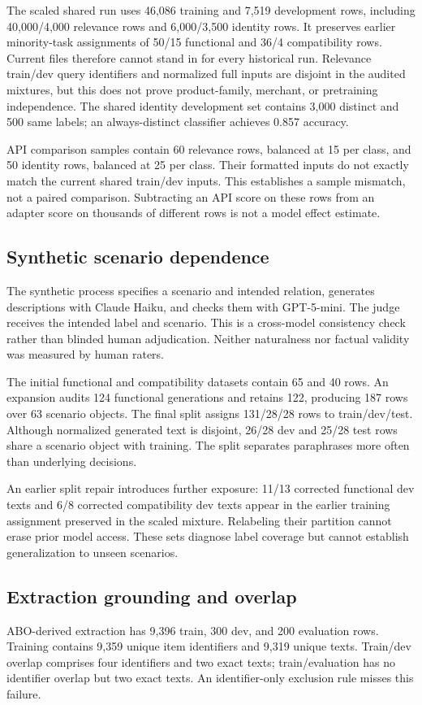 The scaled shared run uses 46,086 training and 7,519 development rows, including 40,000/4,000 relevance rows and 6,000/3,500 identity rows. It preserves earlier minority-task assignments of 50/15 functional and 36/4 compatibility rows. Current files therefore cannot stand in for every historical run. Relevance train/dev query identifiers and normalized full inputs are disjoint in the audited mixtures, but this does not prove product-family, merchant, or pretraining independence. The shared identity development set contains 3,000 distinct and 500 same labels; an always-distinct classifier achieves 0.857 accuracy.

API comparison samples contain 60 relevance rows, balanced at 15 per class, and 50 identity rows, balanced at 25 per class. Their formatted inputs do not exactly match the current shared train/dev inputs. This establishes a sample mismatch, not a paired comparison. Subtracting an API score on these rows from an adapter score on thousands of different rows is not a model effect estimate.

\subsection{Synthetic scenario dependence}
The synthetic process specifies a scenario and intended relation, generates descriptions with Claude Haiku, and checks them with GPT-5-mini. The judge receives the intended label and scenario. This is a cross-model consistency check rather than blinded human adjudication. Neither naturalness nor factual validity was measured by human raters.

The initial functional and compatibility datasets contain 65 and 40 rows. An expansion audits 124 functional generations and retains 122, producing 187 rows over 63 scenario objects. The final split assigns 131/28/28 rows to train/dev/test. Although normalized generated text is disjoint, 26/28 dev and 25/28 test rows share a scenario object with training. The split separates paraphrases more often than underlying decisions.

An earlier split repair introduces further exposure: 11/13 corrected functional dev texts and 6/8 corrected compatibility dev texts appear in the earlier training assignment preserved in the scaled mixture. Relabeling their partition cannot erase prior model access. These sets diagnose label coverage but cannot establish generalization to unseen scenarios.

\subsection{Extraction grounding and overlap}
ABO-derived extraction has 9,396 train, 300 dev, and 200 evaluation rows. Training contains 9,359 unique item identifiers and 9,319 unique texts. Train/dev overlap comprises four identifiers and two exact texts; train/evaluation has no identifier overlap but two exact texts. An identifier-only exclusion rule misses this failure.

